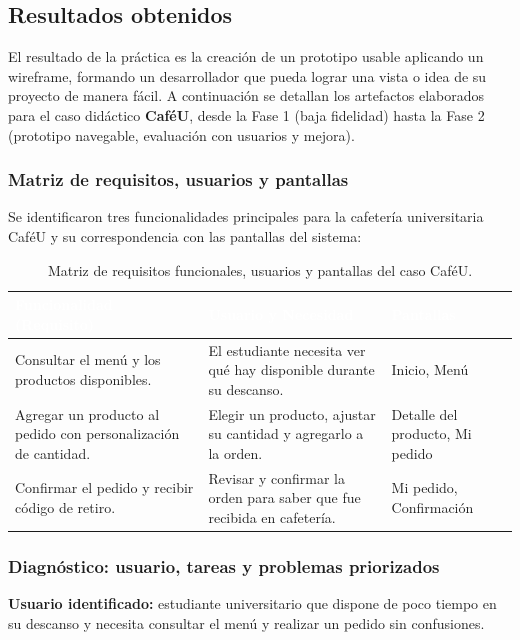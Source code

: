 \documentclass{article}
\begin{document}
\subsection{Resultados obtenidos}
El resultado de la práctica es la creación de un prototipo usable aplicando un wireframe, formando un desarrollador que pueda lograr una vista o idea de su proyecto de manera fácil. A continuación se detallan los artefactos elaborados para el caso didáctico \textbf{CaféU}, desde la Fase 1 (baja fidelidad) hasta la Fase 2 (prototipo navegable, evaluación con usuarios y mejora).

\subsubsection{Matriz de requisitos, usuarios y pantallas}
Se identificaron tres funcionalidades principales para la cafetería universitaria CaféU y su correspondencia con las pantallas del sistema:

\begin{table}[H]
\centering
\renewcommand{\arraystretch}{1.4}
\begin{tabularx}{\textwidth}{|X|X|p{4cm}|}
\hline
\rowcolor{headerblue}
\textcolor{white}{\textbf{Funcionalidad (Requisito)}} & \textcolor{white}{\textbf{Usuario y Necesidad}} & \textcolor{white}{\textbf{Pantallas}} \\ \hline
Consultar el menú y los productos disponibles. & El estudiante necesita ver qué hay disponible durante su descanso. & Inicio, Menú \\ \hline
Agregar un producto al pedido con personalización de cantidad. & Elegir un producto, ajustar su cantidad y agregarlo a la orden. & Detalle del producto, Mi pedido \\ \hline
Confirmar el pedido y recibir código de retiro. & Revisar y confirmar la orden para saber que fue recibida en cafetería. & Mi pedido, Confirmación \\ \hline
\end{tabularx}
\caption{Matriz de requisitos funcionales, usuarios y pantallas del caso CaféU.}
\end{table}

\subsubsection{Diagnóstico: usuario, tareas y problemas priorizados}
\textbf{Usuario identificado:} estudiante universitario que dispone de poco tiempo en su descanso y necesita consultar el menú y realizar un pedido sin confusiones.
\end{document}
